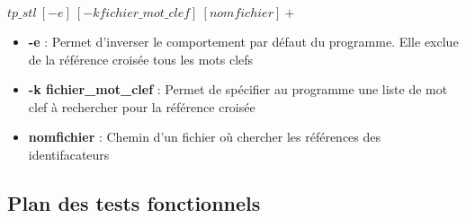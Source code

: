 \documentclass{article}
\begin{document}
\begin{center}
\textbf{$tp\_stl\ [-e]\ [-k fichier\_mot\_clef]\ [nomfichier]+$}
\end{center}

\begin{itemize}

 \item[] \textbf{-e} : Permet d'inverser le comportement par défaut du programme. Elle exclue de la référence croisée tous les mots clefs
 
 \item[] \textbf{-k fichier\_mot\_clef} : Permet de spécifier au programme une liste de mot clef à rechercher pour la référence croisée

 \item[] \textbf{nomfichier} : Chemin d'un fichier où chercher les références des identifacateurs

\end{itemize}

\subsection{Plan des tests fonctionnels}
\end{document}
